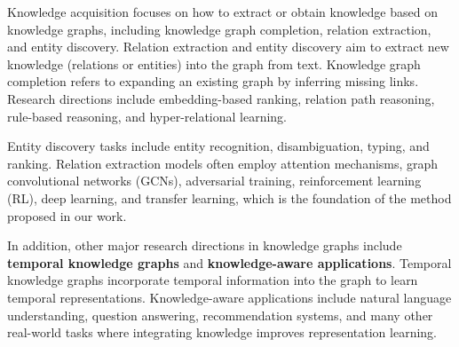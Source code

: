 Knowledge acquisition focuses on how to extract or obtain knowledge based on knowledge graphs, including knowledge graph completion, relation extraction, and entity discovery. Relation extraction and entity discovery aim to extract new knowledge (relations or entities) into the graph from text. Knowledge graph completion refers to expanding an existing graph by inferring missing links. Research directions include embedding-based ranking, relation path reasoning, rule-based reasoning, and hyper-relational learning.

Entity discovery tasks include entity recognition, disambiguation, typing, and ranking. Relation extraction models often employ attention mechanisms, graph convolutional networks (GCNs), adversarial training, reinforcement learning (RL), deep learning, and transfer learning, which is the foundation of the method proposed in our work.

In addition, other major research directions in knowledge graphs include \textbf{temporal knowledge graphs} and \textbf{knowledge-aware applications}. Temporal knowledge graphs incorporate temporal information into the graph to learn temporal representations. Knowledge-aware applications include natural language understanding, question answering, recommendation systems, and many other real-world tasks where integrating knowledge improves representation learning.








